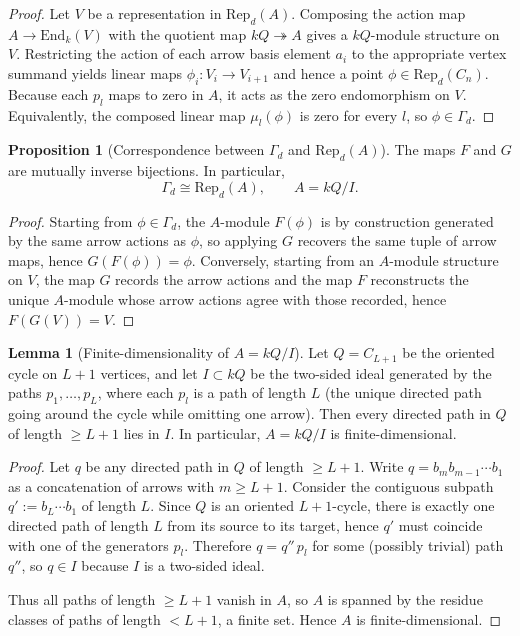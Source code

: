\documentclass{article}
\theoremstyle{definition}
\newtheorem{proposition}[theorem]{Proposition}
\newtheorem{lemma}[theorem]{Lemma}
\begin{document}
\begin{proof}
Let $V$ be a representation in $\mathrm{Rep}_d(A)$.
Composing the action map $A\to \mathrm{End}_k(V)$ with the quotient map $kQ\twoheadrightarrow A$ gives a $kQ$-module structure on $V$.
Restricting the action of each arrow basis element $a_i$ to the appropriate vertex summand yields linear maps $\phi_i:V_i\to V_{i+1}$ and hence a point $\phi\in\mathrm{Rep}_d(C_n)$.
Because each $p_l$ maps to zero in $A$, it acts as the zero endomorphism on $V$.
Equivalently, the composed linear map $\mu_l(\phi)$ is zero for every $l$, so $\phi\in\Gamma_d$.
\end{proof}

\begin{proposition}[Correspondence between $\Gamma_d$ and $\mathrm{Rep}_d(A)$]
The maps $F$ and $G$ are mutually inverse bijections. In particular,
\[
\Gamma_d \cong \mathrm{Rep}_d(A),\qquad A=kQ/I.
\]
\end{proposition}

\begin{proof}
Starting from $\phi\in\Gamma_d$, the $A$-module $F(\phi)$ is by construction generated by the same arrow actions as $\phi$, so applying $G$ recovers the same tuple of arrow maps, hence $G(F(\phi))=\phi$.
Conversely, starting from an $A$-module structure on $V$, the map $G$ records the arrow actions and the map $F$ reconstructs the unique $A$-module whose arrow actions agree with those recorded, hence $F(G(V))=V$.
\end{proof}
\begin{lemma}[Finite-dimensionality of $A=kQ/I$]\label{lem:A-finite-dim}
Let $Q=C_{L+1}$ be the oriented cycle on $L+1$ vertices, and let $I\subset kQ$ be the two-sided ideal generated by the paths
$p_1,\dots,p_{L}$, where each $p_l$ is a path of length $L$ (the unique directed path going around the cycle while omitting one arrow).
Then every directed path in $Q$ of length $\ge L +1$ lies in $I$. In particular, $A=kQ/I$ is finite-dimensional.
\end{lemma}

\begin{proof}
Let $q$ be any directed path in $Q$ of length $\ge L+1$. Write $q=b_m b_{m-1}\cdots b_1$ as a concatenation of arrows with $m\ge L+1$.
Consider the contiguous subpath $q':=b_{L}\cdots b_1$ of length $L$. Since $Q$ is an oriented $L+1$-cycle, there is exactly one directed
path of length $L$ from its source to its target, hence $q'$ must coincide with one of the generators $p_l$.
Therefore $q=q''\,p_l$ for some (possibly trivial) path $q''$, so $q\in I$ because $I$ is a two-sided ideal.

Thus all paths of length $\ge L+1$ vanish in $A$, so $A$ is spanned by the residue classes of paths of length $<L+1$, a finite set. Hence $A$ is finite-dimensional.
\end{proof}
\end{document}

